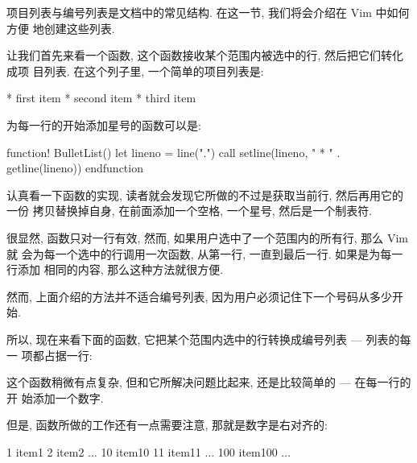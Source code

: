 项目列表与编号列表是文档中的常见结构. 在这一节, 我们将会介绍在 Vim 中如何方便
地创建这些列表.

让我们首先来看一个函数, 这个函数接收某个范围内被选中的行, 然后把它们转化成项
目列表. 在这个列子里, 一个简单的项目列表是:
\begin{vimcode}
* first item
* second item
* third item
\end{vimcode}
为每一行的开始添加星号的函数可以是:
\begin{vimcode}
function! BulletList()
    let lineno = line(".")
    call setline(lineno, "    * " . getline(lineno))
endfunction
\end{vimcode}

认真看一下函数的实现, 读者就会发现它所做的不过是获取当前行, 然后再用它的一份
拷贝替换掉自身, 在前面添加一个空格, 一个星号, 然后是一个制表符.

很显然, 函数只对一行有效, 然而, 如果用户选中了一个范围内的所有行, 那么 Vim 就
会为每一个选中的行调用一次函数, 从第一行, 一直到最后一行. 如果是为每一行添加
相同的内容, 那么这种方法就很方便.

然而, 上面介绍的方法并不适合编号列表, 因为用户必须记住下一个号码从多少开始.

所以, 现在来看下面的函数, 它把某个范围内选中的行转换成编号列表 --- 列表的每一
项都占据一行:

这个函数稍微有点复杂, 但和它所解决问题比起来, 还是比较简单的 --- 在每一行的开
始添加一个数字.

但是, 函数所做的工作还有一点需要注意, 那就是数字是右对齐的:
\begin{vimcode}
    1 item1
    2 item2
    ...
   10 item10
   11 item11
    ...
  100 item100
    ...
\end{vimcode}
